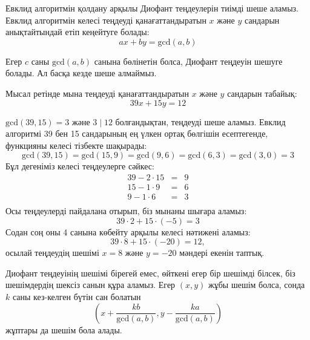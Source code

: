 
Евклид алгоритмін қолдану арқылы Диофант теңдеулерін
тиімді шеше аламыз.
Евклид алгоритмін келесі теңдеуді қанағаттандыратын
$x$ және $y$ сандарын анықтайтындай етіп кеңейтуге болады:
\[
ax + by = \textrm{gcd}(a,b)
\]

Егер $c$ саны $\textrm{gcd}(a,b)$ 
санына бөлінетін болса, Диофант теңдеуін шешуге болады. Ал басқа кезде шеше алмаймыз.

Мысал ретінде мына теңдеуді қанағаттандыратын 
$x$ және $y$ сандарын табайық:
\[
39x + 15y = 12
\]
 
$\textrm{gcd}(39,15)=3$ және $3 \mid 12$ болғандықтан, теңдеуді шеше аламыз. 
Евклид алгоритмі 39 бен 15 сандарының ең 
үлкен ортақ бөлгішін есептегенде, функцияны келесі тізбекте шақырады:
\[
\textrm{gcd}(39,15) = \textrm{gcd}(15,9)
= \textrm{gcd}(9,6) = \textrm{gcd}(6,3)
= \textrm{gcd}(3,0) = 3 \]
Бұл дегеніміз келесі теңдеулерге сәйкес:
\[
\begin{array}{lcl}
39 - 2 \cdot 15 & = & 9 \\
15 - 1 \cdot 9 & = & 6 \\
9 - 1 \cdot 6 & = & 3 \\
\end{array}
\]
Осы теңдеулерді пайдалана отырып, біз мынаны шығара аламыз:
\[
39 \cdot 2 + 15 \cdot (-5) = 3
\]
Содан соң оны 4 санына көбейту арқылы келесі нәтижені аламыз:
\[
39 \cdot 8 + 15 \cdot (-20) = 12,
\]
осылай теңдеудің шешімі $x=8$ және $y=-20$ мәндері
екенін таптық.

Диофант теңдеуінің шешімі бірегей емес, 
өйткені егер бір шешімді білсек, біз шешімдердің 
шексіз санын құра аламыз.
Егер $(x,y)$ жұбы шешім болса, сонда $k$ саны кез-келген бүтін сан болатын
\[(x+\frac{kb}{\textrm{gcd}(a,b)},y-\frac{ka}{\textrm{gcd}(a,b)})\]
жұптары да шешім бола алады.

